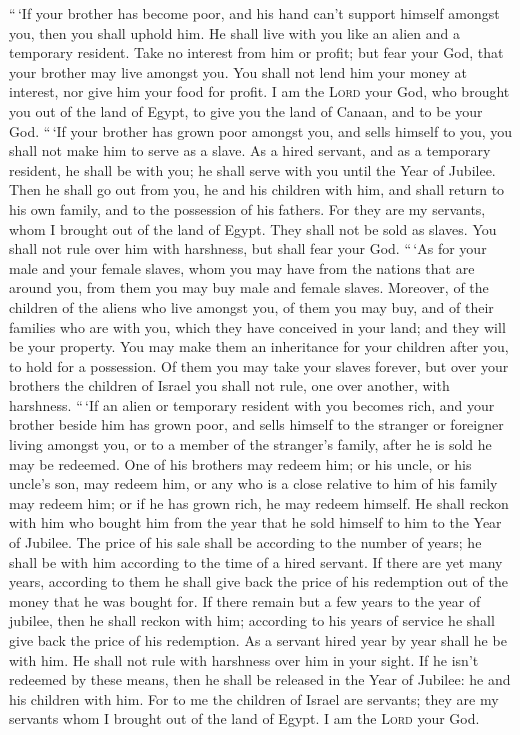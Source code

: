  ``\,`If your brother has become poor, and his hand can't
support himself amongst you, then you shall uphold him. He shall live
with you like an alien and a temporary resident.  Take no
interest from him or profit; but fear your God, that your brother may
live amongst you.  You shall not lend him your money at
interest, nor give him your food for profit.  I am the
\textsc{Lord} your God, who brought you out of the land of Egypt, to
give you the land of Canaan, and to be your God.  ``\,`If
your brother has grown poor amongst you, and sells himself to you, you
shall not make him to serve as a slave.  As a hired
servant, and as a temporary resident, he shall be with you; he shall
serve with you until the Year of Jubilee.  Then he shall
go out from you, he and his children with him, and shall return to his
own family, and to the possession of his fathers.  For
they are my servants, whom I brought out of the land of Egypt. They
shall not be sold as slaves.  You shall not rule over him
with harshness, but shall fear your God.  ``\,`As for
your male and your female slaves, whom you may have from the nations
that are around you, from them you may buy male and female slaves.
 Moreover, of the children of the aliens who live amongst
you, of them you may buy, and of their families who are with you, which
they have conceived in your land; and they will be your property.
 You may make them an inheritance for your children after
you, to hold for a possession. Of them you may take your slaves forever,
but over your brothers the children of Israel you shall not rule, one
over another, with harshness.  ``\,`If an alien or
temporary resident with you becomes rich, and your brother beside him
has grown poor, and sells himself to the stranger or foreigner living
amongst you, or to a member of the stranger's family, 
after he is sold he may be redeemed. One of his brothers may redeem him;
 or his uncle, or his uncle's son, may redeem him, or any
who is a close relative to him of his family may redeem him; or if he
has grown rich, he may redeem himself.  He shall reckon
with him who bought him from the year that he sold himself to him to the
Year of Jubilee. The price of his sale shall be according to the number
of years; he shall be with him according to the time of a hired servant.
 If there are yet many years, according to them he shall
give back the price of his redemption out of the money that he was
bought for.  If there remain but a few years to the year
of jubilee, then he shall reckon with him; according to his years of
service he shall give back the price of his redemption. 
As a servant hired year by year shall he be with him. He shall not rule
with harshness over him in your sight.  If he isn't
redeemed by these means, then he shall be released in the Year of
Jubilee: he and his children with him.  For to me the
children of Israel are servants; they are my servants whom I brought out
of the land of Egypt. I am the \textsc{Lord} your God.

